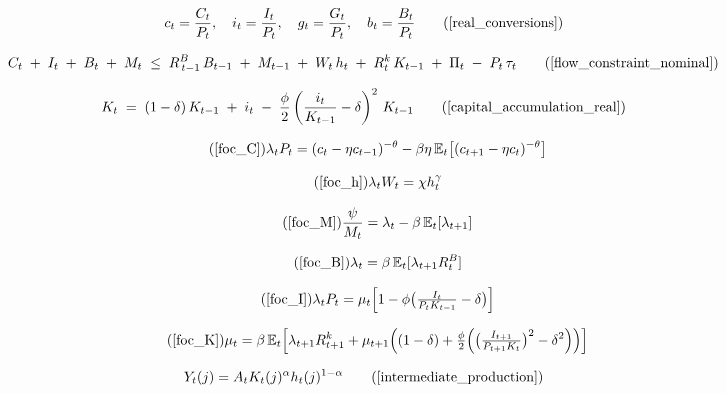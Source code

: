 \documentclass[11pt,preprint]{elsarticle}
\numberwithin{equation}{section}
\numberwithin{figure}{section}
\numberwithin{table}{section}
\begin{document}
\begin{equation}
c_t = \frac{C_t}{P_t}, 
\quad i_t = \frac{I_t}{P_t}, 
\quad g_t = \frac{G_t}{P_t},
\quad b_t = \frac{B_t}{P_t}
\tag{\ref{real_conversions}}
\end{equation}

\begin{equation}
C_t \;+\; I_t \;+\; B_t \;+\; M_t
\;\le\;
R^B_{\,t-1}\,B_{t-1}
\;+\; M_{t-1}
\;+\; W_t\,h_t
\;+\; R^k_t\,K_{t-1}
\;+\; \Pi_t
\;-\; P_t\,\tau_t
\tag{\ref{flow_constraint_nominal}}
\end{equation}

\begin{equation}
K_t
\;=\;
(1 - \delta)\,K_{t-1}
\;+\; i_t
\;-\;\frac{\phi}{2}
\left(\frac{i_t}{K_{t-1}} - \delta\right)^{2}
\,K_{t-1}
\tag{\ref{capital_accumulation_real}}
\end{equation}

\begin{equation}\tag{\ref{foc_C}}
{
  \lambda_t P_t = (c_t-\eta c_{t-1})^{-\theta} - \beta\eta\,\mathbb{E}_t\bigl[(c_{t+1}-\eta c_t)^{-\theta}\bigr]
}
\end{equation}

\begin{equation}\tag{\ref{foc_h}}
{\lambda_t W_t = \chi h_t^{\gamma}}
\end{equation}

\begin{equation}\tag{\ref{foc_M}}
{\frac{\psi}{M_t} = \lambda_t - \beta\,\mathbb{E}_t[\lambda_{t+1}]}
\end{equation}

\begin{equation}\tag{\ref{foc_B}}
{\lambda_t = \beta\,\mathbb{E}_t[\lambda_{t+1}R^B_t]}
\end{equation}

\begin{equation}\tag{\ref{foc_I}}
{\lambda_t P_t = \mu_t 
  \Bigl[ 1 - \phi \bigl( \tfrac{I_t}{P_t K_{t-1}} - \delta \bigr) \Bigr]}
\end{equation}

\begin{equation}\tag{\ref{foc_K}}
{\mu_t = \beta\,\mathbb{E}_t\Bigl[
        \lambda_{t+1}R^k_{t+1}
      + \mu_{t+1}\Bigl(
          (1-\delta)
        + \tfrac{\phi}{2}\Bigl(
            \bigl(\tfrac{I_{t+1}}{P_{t+1}K_t}\bigr)^2
          - \delta^2
          \Bigr)
        \Bigr)
      \Bigr]}  
\end{equation}

\begin{equation}
Y_t(j) = A_t K_t(j)^{\alpha} h_t(j)^{1-\alpha}
\tag{\ref{intermediate_production}}
\end{equation}
\end{document}
